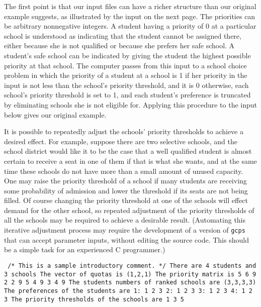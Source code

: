 \documentclass[12pt]{article}
\theoremstyle{definition}
\begin{document}
The first point is that our input files can have a richer structure
than our original example suggests, as illustrated by the input on the
next page.  The priorities can be arbitrary nonnegative integers.  A
student having a priority of 0 at a particular school is understood as
indicating that the student cannot be assigned there, either because
she is not qualified or because she prefers her safe school.  A
student's safe school can be indicated by giving the student the
highest possible priority at that school.  The computer passes from
this input to a school choice problem in which the priority of a
student at a school is 1 if her priority in the input is not less than
the school's priority threshold, and it is 0 otherwise, each school's
priority threshold is set to 1, and each student's preference is
truncated by eliminating schools she is not eligible for.  Applying
this procedure to the input below gives our original example.

It is possible to repeatedly adjust the schools' priority thresholds
to achieve a desired effect.  For example, suppose there are two
selective schools, and the school district would like it to be the
case that a well qualified student is almost certain to receive a seat
in one of them if that is what she wants, and at the same time these
schools do not have more than a small amount of unused capacity.  One
may raise the priority threshold of a school if many students are
receiving some probability of admission and lower the threshold if its
seats are not being filled.  Of course changing the priority threshold
at one of the schools will effect demand for the other school, so
repeated adjustment of the priority thresholds of all the schools may
be required to achieve a desirable result.  (Automating this iterative
adjustment process may require the development of a version of
\texttt{gcps} that can accept parameter inputs, without editing the
source code.  This should be a simple task for an experienced C
programmer.)

\begin{obeylines}\texttt{
/* This is a sample introductory comment. */
There are 4 students and 3 schools
The vector of quotas is (1,2,1)
The priority matrix is
     5     6     9
     2     2     9
     5     4     9
     3     4     9
The students numbers of ranked schools are (3,3,3,3)
The preferences of the students are
1:  1  2  3  
2:  1  2  3  
3:  1  2  3  
4:  1  2  3  
The priority thresholds of the schools are
1   3   5   
  }
\end{obeylines}
\end{document}

